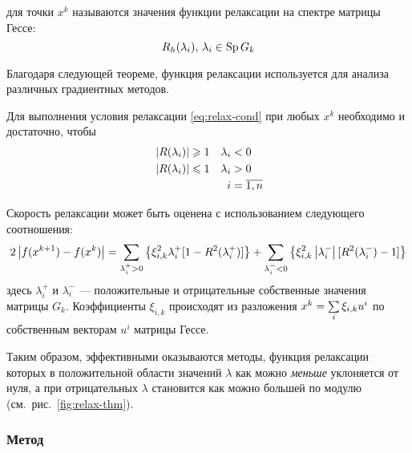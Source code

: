 \begin{dfn}
   для точки $x^k$ называются значения
  функции релаксации на спектре матрицы Гессе:
  \begin{equation}
    \label{eq:relax-fac}
    R_h(\lambda_i),\, \lambda_i \in \operatorname{Sp}{G_k}
  \end{equation}
\end{dfn}

Благодаря следующей теореме, функция релаксации используется для
анализа различных градиентных методов.

\begin{thm}
  \label{thm:relax-thm}
  Для выполнения условия релаксации \eqref{eq:relax-cond} при любых
  $x^k$ необходимо и достаточно, чтобы
  \begin{equation}
    \label{eq:relax-thm}
    \begin{aligned}
      & \left \lvert{R(\lambda_i)}\right \rvert \geqslant 1 & \lambda_i& < 0 \\
      & \left \lvert{R(\lambda_i)}\right \rvert \leqslant 1 & \lambda_i& > 0\\
      &&i& = \overline{1, n}
    \end{aligned}
  \end{equation}
\end{thm}



Скорость релаксации может быть оценена с использованием следующего
соотношения:
\begin{equation}
  \label{eq:relax-speed}
  2\left \lvert{f(x^{k+1})-f(x^k)}\right \rvert=\sum_{\lambda_i^+>0} \left\{\xi_{i,k}^2
    \lambda_i^+ [1-R^2(\lambda_i^+)]\right\} + \sum_{\lambda_i^-<0} \left\{\xi_{i,k}^2
    \left \lvert{\lambda_i^-}\right \rvert [R^2(\lambda_i^-)-1]\right\}
\end{equation}
здесь $\lambda_i^+$ и $\lambda_i^-$ — положительные и отрицательные
собственные значения матрицы $G_k$. Коэффициенты $\xi_{i,k}$
происходят из разложения $x^k=\sum\limits_i{\xi_{i,k}u^i}$ по собственным
векторам $u^i$ матрицы Гессе.

Таким образом, эффективными оказываются методы, функция релаксации
которых в положительной области значений $\lambda$ как можно
\emph{меньше} уклоняется от нуля, а при отрицательных $\lambda$
становится как можно большей по модулю
(см. рис. \ref{fig:relax-thm}).

\subsubsection{Метод \gd{}}
\label{sec:gd}


